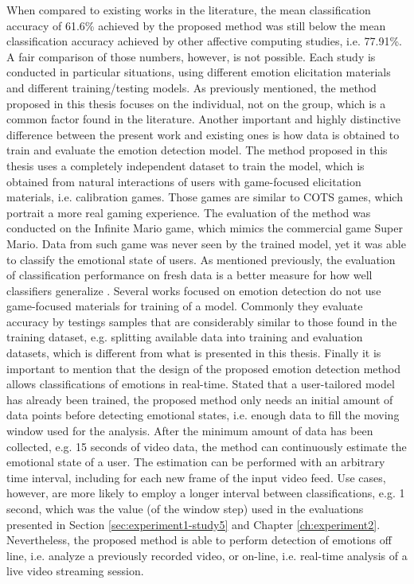 When compared to existing works in the literature, the mean classification accuracy of 61.6\% achieved by the proposed method was still below the mean classification accuracy achieved by other affective computing studies, i.e. 77.91\%. A fair comparison of those numbers, however, is not possible. Each study is conducted in particular situations, using different emotion elicitation materials and different training/testing models. As previously mentioned, the method proposed in this thesis focuses on the individual, not on the group, which is a common factor found in the literature. Another important and highly distinctive difference between the present work and existing ones is how data is obtained to train and evaluate the emotion detection model. The method proposed in this thesis uses a completely independent dataset to train the model, which is obtained from natural interactions of users with game-focused elicitation materials, i.e. calibration games. Those games are similar to COTS games, which portrait a more real gaming experience. The evaluation of the method was conducted on the Infinite Mario game, which mimics the commercial game Super Mario. Data from such game was never seen by the trained model, yet it was able to classify the emotional state of users. As mentioned previously, the evaluation of classification performance on fresh data is a better measure for how well classifiers generalize \parencite[Chapter 5]{james2013introduction}. Several works focused on emotion detection do not use game-focused materials for training of a model. Commonly they evaluate accuracy by testings samples that are considerably similar to those found in the training dataset, e.g. splitting available data into training and evaluation datasets, which is different from what is presented in this thesis. Finally it is important to mention that the design of the proposed emotion detection method allows classifications of emotions in real-time. Stated that a user-tailored model has already been trained, the proposed method only needs an initial amount of data points before detecting emotional states, i.e. enough data to fill the moving window used for the analysis. After the minimum amount of data has been collected, e.g. 15 seconds of video data, the method can continuously estimate the emotional state of a user. The estimation can be performed with an arbitrary time interval, including for each new frame of the input video feed. Use cases, however, are more likely to employ a longer interval between classifications, e.g. 1 second, which was the value (of the window step) used in the evaluations presented in Section \ref{sec:experiment1-study5} and Chapter \ref{ch:experiment2}. Nevertheless, the proposed method is able to perform detection of emotions off line, i.e. analyze a previously recorded video, or on-line, i.e. real-time analysis of a live video streaming session.

